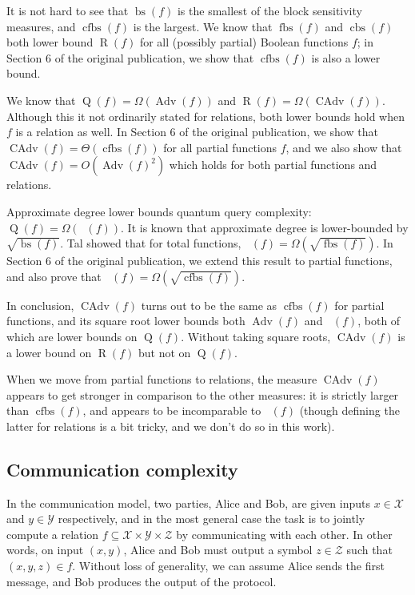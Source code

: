 \documentclass[10pt,a4paper]{article}
\theoremstyle{definition}
\newcommand{\X}{\mathcal{X}}
\newcommand{\Y}{\mathcal{Y}}
\newcommand{\Z}{\mathcal{Z}}
\renewcommand{\>}{\rangle}
\newcommand{\<}{\langle}
\DeclareMathOperator{\R}{R}
\DeclareMathOperator{\Q}{Q}
\DeclareMathOperator{\bs}{bs}
\DeclareMathOperator{\fbs}{fbs}
\DeclareMathOperator{\cbs}{cbs}
\DeclareMathOperator{\cfbs}{cfbs}
\DeclareMathOperator{\Adv}{Adv}
\DeclareMathOperator{\CAdv}{CAdv}
\DeclareMathOperator{\adeg}{\widetilde{\deg}}
\begin{document}
It is not hard to see that $\bs(f)$ is the smallest
of the block sensitivity measures, and $\cfbs(f)$ is
the largest. We know \cite{Aar08,HN12}
that $\fbs(f)$ and $\cbs(f)$ both lower bound $\R(f)$
for all (possibly partial) Boolean functions $f$;
in Section 6 of the original publication, we show that $\cfbs(f)$ is also
a lower bound.

We know \cite{LM08,SS06,AKPV18} that
$\Q(f)=\Omega(\Adv(f))$ and $\R(f)=\Omega(\CAdv(f))$.
Although this it not ordinarily stated for relations,
both lower bounds hold when $f$ is a relation as well.
In Section 6 of the original publication, we show that
$\CAdv(f)=\Theta(\cfbs(f))$
for all partial functions $f$,
and we also show that
$\CAdv(f)=O(\Adv(f)^2)$
which holds for both partial functions and relations.

Approximate degree lower bounds quantum query complexity:
$\Q(f)=\Omega(\adeg(f))$.
It is known \cite{BBC+01} that approximate
degree is lower-bounded by $\sqrt{\bs(f)}$.
Tal \cite{Tal13} showed that for total functions,
$\adeg(f)=\Omega(\sqrt{\fbs(f)})$.
In Section 6 of the original publication, we extend this result to partial
functions, and also prove that
$\adeg(f)=\Omega(\sqrt{\cfbs(f)})$.

In conclusion, $\CAdv(f)$ turns out to be the same
as $\cfbs(f)$ for partial functions,
and its square root lower bounds both
$\Adv(f)$ and $\adeg(f)$, both of which are lower bounds
on $\Q(f)$. Without taking square roots,
$\CAdv(f)$ is a lower bound on $\R(f)$
but not on $\Q(f)$.

When we move from partial functions
to relations, the measure $\CAdv(f)$ appears to get stronger
in comparison to the other measures: it is
strictly larger than $\cfbs(f)$, and appears to be
incomparable to $\adeg(f)$ (though defining the
latter for relations is a bit tricky, and we don't
do so in this work).


\subsection{Communication complexity}

In the communication model, two parties, Alice and Bob, are given inputs $x\in\X$ and $y\in\Y$ respectively, and in the most general case the task is to jointly compute a relation $f\subseteq \X\times\Y\times\Z$ by communicating with each other. In other words, on input $(x,y)$,
Alice and Bob must output a symbol
$z\in\Z$ such that $(x,y,z)\in f$.
Without loss of generality, we can assume Alice sends the first message, and Bob produces the output of the protocol.
\end{document}

